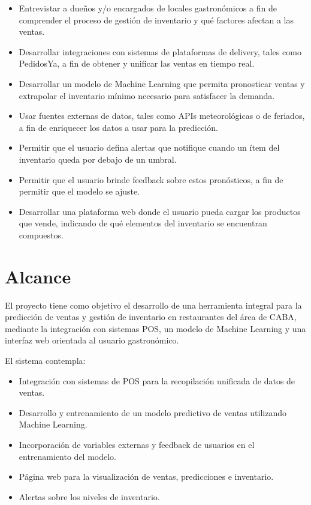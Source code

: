 \begin{itemize}
    \item Entrevistar a dueños y/o encargados de locales gastronómicos a fin de comprender el proceso de gestión de inventario y qué factores afectan a las ventas.
    
    \item Desarrollar integraciones con sistemas de plataformas de delivery, tales como PedidosYa, a fin de obtener y unificar las ventas en tiempo real.
    
    \item Desarrollar un modelo de Machine Learning que permita pronosticar ventas y extrapolar el inventario mínimo necesario para satisfacer la demanda.
    
    \item Usar fuentes externas de datos, tales como APIs meteorológicas o de feriados, a fin de enriquecer los datos a usar para la predicción.
    
    \item Permitir que el usuario defina alertas que notifique cuando un ítem del inventario queda por debajo de un umbral.
    
    \item Permitir que el usuario brinde feedback sobre estos pronósticos, a fin de permitir que el modelo se ajuste.
    
    \item Desarrollar una plataforma web donde el usuario pueda cargar los productos que vende, indicando de qué elementos del inventario se encuentran compuestos.
\end{itemize}

\section{Alcance}

El proyecto tiene como objetivo el desarrollo de una herramienta integral para la predicción de ventas y gestión de inventario en restaurantes del área de CABA, mediante la integración con sistemas POS, un modelo de Machine Learning y una interfaz web orientada al usuario gastronómico. 

El sistema contempla: 

\begin{itemize}
    \item Integración con sistemas de POS para la recopilación unificada de datos de ventas. 
    \item Desarrollo y entrenamiento de un modelo predictivo de ventas utilizando Machine Learning. 
    \item Incorporación de variables externas y feedback de usuarios en el entrenamiento del modelo. 
    \item Página web para la visualización de ventas, predicciones e inventario. 
    \item Alertas sobre los niveles de inventario. 
\end{itemize}

